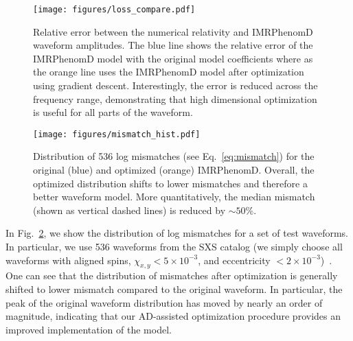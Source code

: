 \documentclass[twocolumn]{aastex631}
\newcommand{\te}[1]{\textbf{\color{pyGreen}(TE: #1)}}
\newcommand{\AZ}[1]{{\color{Burnt}[AZ: #1]}}
\begin{document}

\begin{figure}[t]
	\begin{centering}
		\texttt{[image: figures/loss\_compare.pdf]}
		\caption{
			Relative error between the numerical relativity and IMRPhenomD waveform amplitudes. 
            The blue line shows the relative error of the IMRPhenomD model with the original model coefficients where as the orange line uses the IMRPhenomD model after optimization using gradient descent.
            Interestingly, the error is reduced across the frequency range, demonstrating that high dimensional optimization is useful for all parts of the waveform.
        }
		\label{fig:loss_compare}
	\end{centering}
\end{figure}

\begin{figure}[t]
	\begin{centering}
		\texttt{[image: figures/mismatch\_hist.pdf]}
		\caption{
			Distribution of 536 log mismatches (see Eq.~\eqref{eq:mismatch}) for the original (blue) and optimized (orange) IMRPhenomD. 
            Overall, the optimized distribution shifts to lower mismatches and therefore a better waveform model. 
            More quantitatively, the median mismatch (shown as vertical dashed lines) is reduced by $\sim50$\%. 
		}
		\label{fig:mismatch_hist}
	\end{centering}
\end{figure}
 
In Fig.~\ref{fig:mismatch_hist}, we show the distribution of log mismatches for a set of test waveforms.
In particular, we use 536 waveforms from the SXS catalog (we simply choose all waveforms with aligned spins, $\chi_{x,y}<5\times 10^{-3}$, and eccentricity $<2\times 10^{-3}$)~\citep{Boyle:2019kee}.
One can see that the distribution of mismatches after optimization is generally shifted to lower mismatch compared to the original waveform.
In particular, the peak of the original waveform distribution has moved by nearly an order of magnitude, indicating that our AD-assisted optimization procedure provides an improved implementation of the model.
\end{document}
